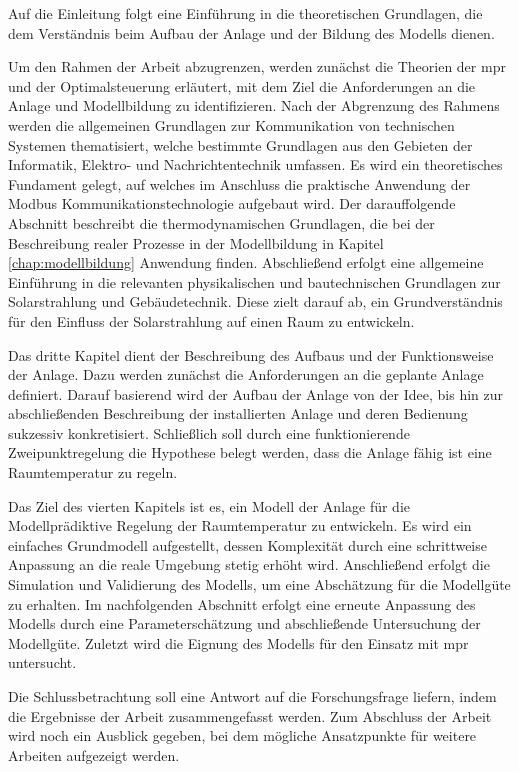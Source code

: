 Auf die Einleitung folgt eine Einführung in die theoretischen Grundlagen, die dem Verständnis beim Aufbau der Anlage und der Bildung des Modells dienen.

Um den Rahmen der Arbeit abzugrenzen, werden zunächst die Theorien der \acrlong{mpr} und der Optimalsteuerung erläutert, mit dem Ziel die Anforderungen an die Anlage und Modellbildung zu identifizieren.
Nach der Abgrenzung des Rahmens werden die allgemeinen Grundlagen zur Kommunikation von technischen Systemen thematisiert, welche bestimmte Grundlagen aus den Gebieten der Informatik, Elektro- und Nachrichtentechnik umfassen. Es wird ein theoretisches Fundament gelegt, auf welches im Anschluss die praktische Anwendung der Modbus Kommunikationstechnologie aufgebaut wird.
Der darauffolgende Abschnitt beschreibt die thermodynamischen Grundlagen, die bei der Beschreibung realer Prozesse in der Modellbildung in Kapitel \ref{chap:modellbildung} Anwendung finden.
Abschließend erfolgt eine allgemeine Einführung in die relevanten physikalischen und bautechnischen Grundlagen zur Solarstrahlung und Gebäudetechnik. Diese zielt darauf ab, ein Grundverständnis für den Einfluss der Solarstrahlung auf einen Raum zu entwickeln.

Das dritte Kapitel dient der Beschreibung des Aufbaus und der Funktionsweise der Anlage. Dazu werden zunächst die Anforderungen an die geplante Anlage definiert. Darauf basierend wird der Aufbau der Anlage von der Idee, bis hin zur abschließenden Beschreibung der installierten Anlage und deren Bedienung sukzessiv konkretisiert. Schließlich soll durch eine funktionierende Zweipunktregelung die Hypothese belegt werden, dass die Anlage fähig ist eine Raumtemperatur zu regeln.

Das Ziel des vierten Kapitels ist es, ein Modell der Anlage für die Modellprädiktive Regelung der Raumtemperatur zu entwickeln. Es wird ein einfaches Grundmodell aufgestellt, dessen Komplexität durch eine schrittweise Anpassung an die reale Umgebung stetig erhöht wird. Anschließend erfolgt die Simulation und Validierung des Modells, um eine Abschätzung für die Modellgüte zu erhalten. Im nachfolgenden Abschnitt erfolgt eine erneute Anpassung des Modells durch eine Parameterschätzung und abschließende Untersuchung der Modellgüte. Zuletzt wird die Eignung des Modells für den Einsatz mit \acrlong{mpr} untersucht.
  
Die Schlussbetrachtung soll eine Antwort auf die Forschungsfrage liefern, indem die Ergebnisse der Arbeit zusammengefasst werden. Zum Abschluss der Arbeit wird noch ein Ausblick gegeben, bei dem mögliche Ansatzpunkte für weitere Arbeiten aufgezeigt werden.